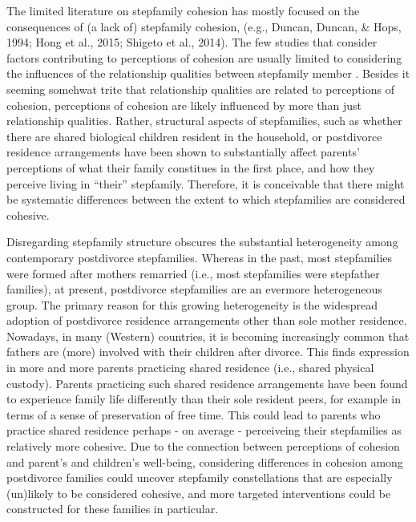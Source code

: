 \documentclass[\pandocDocMode,longtable,floatsintext]{apa6}
\begin{document}
The limited literature on stepfamily cohesion has mostly focused on the
consequences of (a lack of) stepfamily cohesion, (e.g., Duncan, Duncan,
\& Hops, 1994; Hong et al., 2015; Shigeto et al., 2014). The few studies
that consider factors contributing to perceptions of cohesion are
usually limited to considering the influences of the relationship
qualities between stepfamily member
\autocite[e.g.,][]{jensen2022associations}. Besides it seeming somehwat
trite that relationship qualities are related to perceptions of
cohesion, perceptions of cohesion are likely influenced by more than
just relationship qualities. Rather, structural aspects of stepfamilies,
such as whether there are shared biological children resident in the
household, or postdivorce residence arrangements have been shown to
substantially affect parents' perceptions of what their family
constitues in the first place, and how they perceive living in ``their''
stepfamily. Therefore, it is conceivable that there might be systematic
differences between the extent to which stepfamilies are considered
cohesive.

Disregarding stepfamily structure obscures the substantial heterogeneity
among contemporary postdivorce stepfamilies. Whereas in the past, most
stepfamilies were formed after mothers remarried (i.e., most
stepfamilies were stepfather families), at present, postdivorce
stepfamilies are an evermore heterogeneous group. The primary reason for
this growing heterogeneity is the widespread adoption of postdivorce
residence arrangements other than sole mother residence. Nowadays, in
many (Western) countries, it is becoming increasingly common that
fathers are (more) involved with their children after divorce. This
finds expression in more and more parents practicing shared residence
(i.e., shared physical custody). Parents practicing such shared
residence arrangements have been found to experience family life
differently than their sole resident peers, for example in terms of a
sense of preservation of free time. This could lead to parents who
practice shared residence perhaps - on average - perceiveing their
stepfamilies as relatively more cohesive. Due to the connection between
perceptions of cohesion and parent's and children's well-being,
considering differences in cohesion among postdivorce families could
uncover stepfamily constellations that are especially (un)likely to be
considered cohesive, and more targeted interventions could be
constructed for these families in particular.
\end{document}
